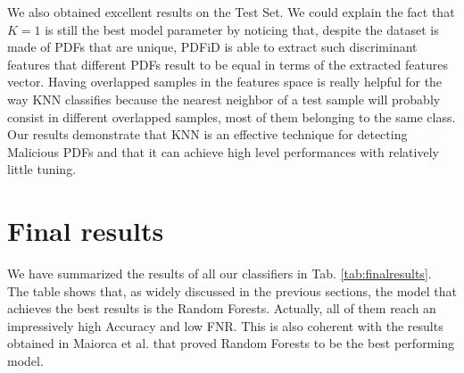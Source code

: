 \documentclass[twocolumn, switch]{article} %
\begin{document}
We also obtained excellent results on the Test Set. We could explain the fact that $K=1$ is still the best model parameter by noticing that, despite the dataset is made of PDFs that are unique, PDFiD is able to extract such discriminant features that different PDFs result to be equal in terms of the extracted features vector. Having overlapped samples in the features space is really helpful for the way KNN classifies because the nearest neighbor of a test sample will probably consist in different overlapped samples, most of them belonging to the same class.
Our results demonstrate that KNN is an effective technique for detecting Malicious PDFs and that it can achieve high level performances with relatively little tuning.

\section{Final results}
\label{sec:finalresults}
We have summarized the results of all our classifiers in Tab. \ref{tab:finalresults}.
The table shows that, as widely discussed in the previous sections, the model that achieves the best results is the Random Forests. Actually, all of them reach an impressively high Accuracy and low FNR. This is also coherent with the results obtained in Maiorca et al. \cite{maiorca_giacinto_corona_1970} that proved Random Forests to be the best performing model.
\end{document}
